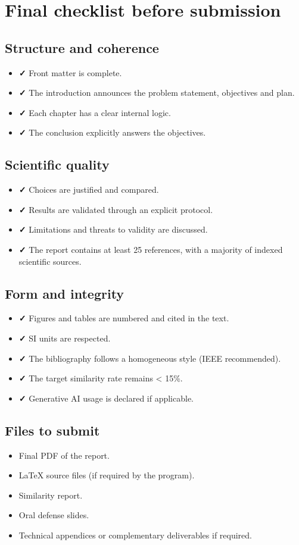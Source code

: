 \chapter{Final checklist before submission}

\section{Structure and coherence}

\begin{itemize}
    \item \textbf{✓} Front matter is complete.
    \item \textbf{✓} The introduction announces the problem statement, objectives and plan.
    \item \textbf{✓} Each chapter has a clear internal logic.
    \item \textbf{✓} The conclusion explicitly answers the objectives.
\end{itemize}

\section{Scientific quality}

\begin{itemize}
    \item \textbf{✓} Choices are justified and compared.
    \item \textbf{✓} Results are validated through an explicit protocol.
    \item \textbf{✓} Limitations and threats to validity are discussed.
    \item \textbf{✓} The report contains at least 25 references, with a majority of indexed scientific sources.
\end{itemize}

\section{Form and integrity}

\begin{itemize}
    \item \textbf{✓} Figures and tables are numbered and cited in the text.
    \item \textbf{✓} SI units are respected.
    \item \textbf{✓} The bibliography follows a homogeneous style (IEEE recommended).
    \item \textbf{✓} The target similarity rate remains < 15\%.
    \item \textbf{✓} Generative AI usage is declared if applicable.
\end{itemize}

\section{Files to submit}

\begin{itemize}
    \item Final PDF of the report.
    \item LaTeX source files (if required by the program).
    \item Similarity report.
    \item Oral defense slides.
    \item Technical appendices or complementary deliverables if required.
\end{itemize}
